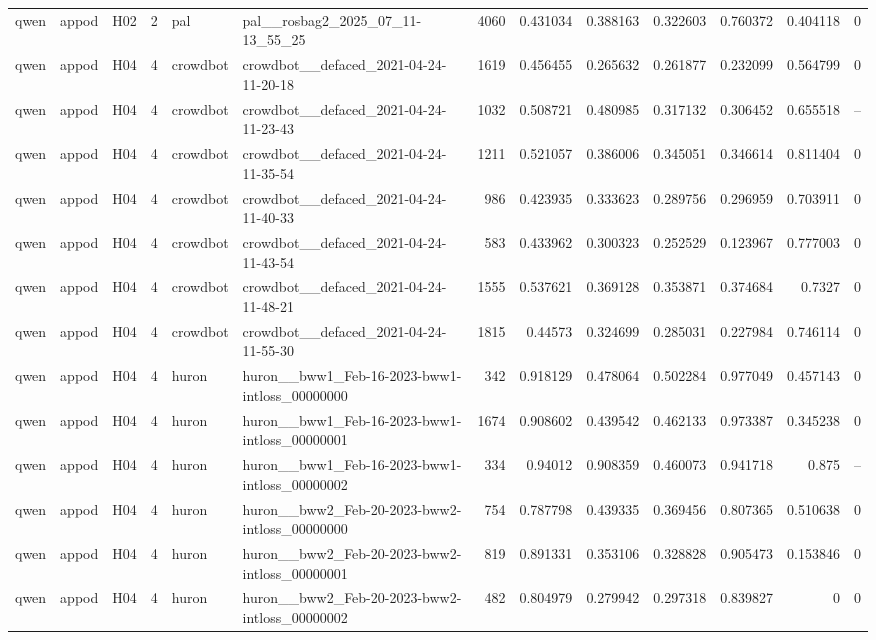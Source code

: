 \begin{longtable}{lllrllrrrrrrr}
qwen & appod & H02 & 2 & pal & pal\_\_rosbag2\_2025\_07\_11-13\_55\_25 & 4060 & 0.431034 & 0.388163 & 0.322603 & 0.760372 & 0.404118 & 0 \\
qwen & appod & H04 & 4 & crowdbot & crowdbot\_\_defaced\_2021-04-24-11-20-18 & 1619 & 0.456455 & 0.265632 & 0.261877 & 0.232099 & 0.564799 & 0 \\
qwen & appod & H04 & 4 & crowdbot & crowdbot\_\_defaced\_2021-04-24-11-23-43 & 1032 & 0.508721 & 0.480985 & 0.317132 & 0.306452 & 0.655518 & -- \\
qwen & appod & H04 & 4 & crowdbot & crowdbot\_\_defaced\_2021-04-24-11-35-54 & 1211 & 0.521057 & 0.386006 & 0.345051 & 0.346614 & 0.811404 & 0 \\
qwen & appod & H04 & 4 & crowdbot & crowdbot\_\_defaced\_2021-04-24-11-40-33 & 986 & 0.423935 & 0.333623 & 0.289756 & 0.296959 & 0.703911 & 0 \\
qwen & appod & H04 & 4 & crowdbot & crowdbot\_\_defaced\_2021-04-24-11-43-54 & 583 & 0.433962 & 0.300323 & 0.252529 & 0.123967 & 0.777003 & 0 \\
qwen & appod & H04 & 4 & crowdbot & crowdbot\_\_defaced\_2021-04-24-11-48-21 & 1555 & 0.537621 & 0.369128 & 0.353871 & 0.374684 & 0.7327 & 0 \\
qwen & appod & H04 & 4 & crowdbot & crowdbot\_\_defaced\_2021-04-24-11-55-30 & 1815 & 0.44573 & 0.324699 & 0.285031 & 0.227984 & 0.746114 & 0 \\
qwen & appod & H04 & 4 & huron & huron\_\_bww1\_Feb-16-2023-bww1-intloss\_00000000 & 342 & 0.918129 & 0.478064 & 0.502284 & 0.977049 & 0.457143 & 0 \\
qwen & appod & H04 & 4 & huron & huron\_\_bww1\_Feb-16-2023-bww1-intloss\_00000001 & 1674 & 0.908602 & 0.439542 & 0.462133 & 0.973387 & 0.345238 & 0 \\
qwen & appod & H04 & 4 & huron & huron\_\_bww1\_Feb-16-2023-bww1-intloss\_00000002 & 334 & 0.94012 & 0.908359 & 0.460073 & 0.941718 & 0.875 & -- \\
qwen & appod & H04 & 4 & huron & huron\_\_bww2\_Feb-20-2023-bww2-intloss\_00000000 & 754 & 0.787798 & 0.439335 & 0.369456 & 0.807365 & 0.510638 & 0 \\
qwen & appod & H04 & 4 & huron & huron\_\_bww2\_Feb-20-2023-bww2-intloss\_00000001 & 819 & 0.891331 & 0.353106 & 0.328828 & 0.905473 & 0.153846 & 0 \\
qwen & appod & H04 & 4 & huron & huron\_\_bww2\_Feb-20-2023-bww2-intloss\_00000002 & 482 & 0.804979 & 0.279942 & 0.297318 & 0.839827 & 0 & 0 \\

\end{longtable}
